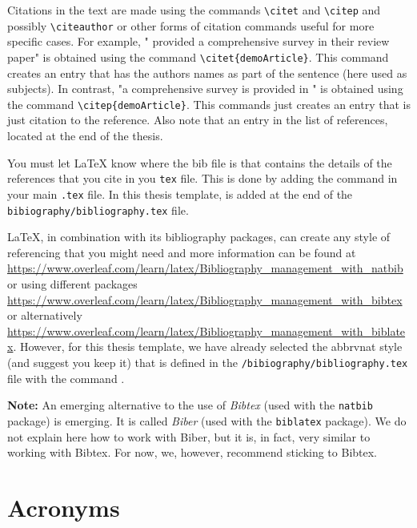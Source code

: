Citations in the text are made using the commands \verb|\citet| and \verb|\citep| and possibly \verb|\citeauthor| or other forms of citation commands useful for more specific cases.
For example, "\citet{demoArticle} provided a comprehensive survey in their review paper" is obtained using the command \verb|\citet{demoArticle}|.
This command creates an entry that has the authors names as part of the sentence (here used as subjects). 
In contrast, "a comprehensive survey is provided in \citep{demoArticle}" is obtained using the command \verb|\citep{demoArticle}|. 
This commands just creates an entry that is just citation to the reference.
Also note that an entry in the list of references, located at the end of the thesis.

You must let \LaTeX{} know where the bib file is that contains the details of the references that you cite in you \verb|tex| file.
This is done by adding the command \verb|| in your main \verb|.tex| file.
In this thesis template, \verb|| is added at the end of the \verb|bibiography/bibliography.tex| file.

\LaTeX{}, in combination with its bibliography packages, can create any style of referencing that you might need and more information can be found at  \url{https://www.overleaf.com/learn/latex/Bibliography_management_with_natbib} or using different packages \url{https://www.overleaf.com/learn/latex/Bibliography_management_with_bibtex} or alternatively \url{https://www.overleaf.com/learn/latex/Bibliography_management_with_biblatex}.
However, for this thesis template, we have already selected the abbrvnat style (and suggest you keep it) that is defined in the \verb|/bibiography/bibliography.tex| file with the command \verb||.

\textbf{Note:} An emerging alternative to the use of \emph{Bibtex} (used with the \verb|natbib| package) is emerging.
It is called \emph{Biber} (used with the \verb|biblatex| package).
We do not explain here how to work with Biber, but it is, in fact, very similar to working with Bibtex. 
For now, we, however, recommend sticking to Bibtex.

\section{Acronyms}
\label{sec:Acronyms}

